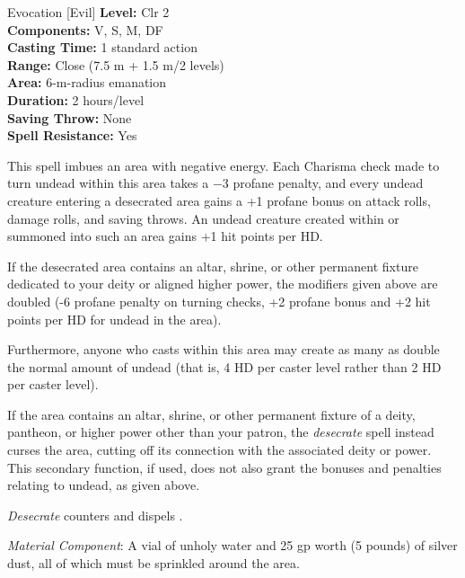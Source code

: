 {Evocation [Evil]}
{
	\textbf{Level:}
	Clr 2\\
	\textbf{Components:}
	V, S, M, DF\\
	\textbf{Casting Time:}
	1 standard action\\
	\textbf{Range:}
	Close (7.5 m + 1.5 m/2 levels)\\
	\textbf{Area:}
	6-m-radius emanation\\
	\textbf{Duration:}
	2 hours/level\\
	\textbf{Saving Throw:}
	None\\
	\textbf{Spell Resistance:}
	Yes\\
}
{
	This spell imbues an area with negative energy. Each Charisma check made to turn undead within this area takes a $-3$ profane penalty, and every undead creature entering a desecrated area gains a +1 profane bonus on attack rolls, damage rolls, and saving throws. An undead creature created within or summoned into such an area gains +1 hit points per HD.

	If the desecrated area contains an altar, shrine, or other permanent fixture dedicated to your deity or aligned higher power, the modifiers given above are doubled (-6 profane penalty on turning checks, +2 profane bonus and +2 hit points per HD for undead in the area).

	Furthermore, anyone who casts  within this area may create as many as double the normal amount of undead (that is, 4 HD per caster level rather than 2 HD per caster level).

	If the area contains an altar, shrine, or other permanent fixture of a deity, pantheon, or higher power other than your patron, the \emph{desecrate} spell instead curses the area, cutting off its connection with the associated deity or power. This secondary function, if used, does not also grant the bonuses and penalties relating to undead, as given above.

	\emph{Desecrate} counters and dispels .

	\textit{Material Component}:
	A vial of unholy water and 25 gp worth (5 pounds) of silver dust, all of which must be sprinkled around the area.

}
